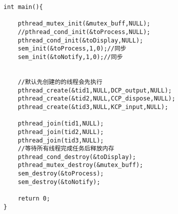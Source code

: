\documentclass[UTF8]{ctexart}
\begin{document}
\begin{lstlisting}
int main(){

    pthread_mutex_init(&mutex_buff,NULL);
    //pthread_cond_init(&toProcess,NULL);
    pthread_cond_init(&toDisplay,NULL);
    sem_init(&toProcess,1,0);//同步
    sem_init(&toNotify,1,0);//同步

    
    //默认先创建的的线程会先执行
    pthread_create(&tid1,NULL,DCP_output,NULL);
    pthread_create(&tid2,NULL,CCP_dispose,NULL);
    pthread_create(&tid3,NULL,KCP_input,NULL);
    
    pthread_join(tid1,NULL);
    pthread_join(tid2,NULL);
    pthread_join(tid3,NULL);
    //等待所有线程完成任务后释放内存
    pthread_cond_destroy(&toDisplay);
    pthread_mutex_destroy(&mutex_buff);
    sem_destroy(&toProcess);
    sem_destroy(&toNotify);
    
    return 0;
}
\end{lstlisting}
\end{document}
